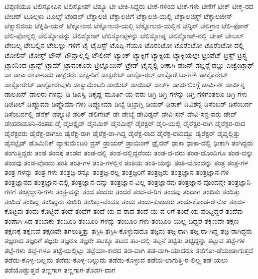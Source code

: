 {ಟಿಪ್ಪಣಿಯೂ
ಟಿಲಿಸ್ಕೋಪಿನ
ಟಿಲಿಸ್ಕೋಪ್
ಟಿಶ್ಯೂ
ಟೀ
ಟೀಕಿ-ಸಿದ್ದರು
ಟೀಕೆ-ಗಳಿಂದ
ಟೀಕೆ-ಗಳು
ಟೀಕೆಗೆ
ಟೀಕ್
ಟೀಕ್ಮ-ರದ
ಟೀಚರ್
ಟೂಲ್ಗಳು
ಟೂಲ್ಸ್
ಟೆಂಡಲ್
ಟೆಕ್ನಾಲಜಿ
ಟೆಕ್ನಾಲಜಿಗೆ
ಟೆಕ್ನಾಲಜಿ-ಯಲ್ಲಿ
ಟೆಕ್ನಾಲಜಿಸ್ಟ್
ಟೆಕ್ನಾಲಜೀಸ್
ಟೆಕ್ನಾಲಿಜಿಯ
ಟೆಕ್ನಿಷಿ-ಯನ್
ಟೆಕ್ನೋಲಜಿ
ಟೆಕ್ನೋಲಜಿ-ಯಲ್ಲಿ
ಟೆಕ್ನೋಲಜಿ-ಯಲ್ಲಿನ
ಟೆನ್ನಿಸ್
ಟೆಲಿಗ್ರಾಂ
ಟೆಲಿ-ಫೋನ್
ಟೆಲಿ-ಫೋನ್ನಲ್ಲಿ
ಟೆಲಿಸ್ಕೋಪನ್ನು
ಟೆಲಿಸ್ಕೋಪ್
ಟೆಲಿಸ್ಕೋಪ್ಗಳನ್ನು
ಟೆಲಿಸ್ಕೋಪ್ನ
ಟೆಲಿಸ್ಕೋಪ್-ನಲ್ಲಿ
ಟೇಪ್
ಟೇಬಲ್
ಟೇಬಲ್ನ
ಟೇಬಲ್ಲಿನ
ಟೇಬಲ್ಲು-ಗಳಿಗೆ
ಟೈ
ಟೈಪಿಸ್ಟ್
ಟೊಪ್ಪಿ-ಗೆಯೂ
ಟೊರಂಟೋ
ಟೊರೆಂಟೋ
ಟೊರೆಂಟೋ-ದಲ್ಲಿ
ಟೋಲಿನ್
ಟೋಸ್ಟ್
ಟೌನ್
ಟೌನ್ಹಾಲ್ನಲ್ಲಿ
ಟೌಲೀನ್
ಟ್ಯಾಂಕ್
ಟ್ಯಾಕ್ಸಿಗೆ
ಟ್ಯಾಕ್ಸಿಯ
ಟ್ಯಾಕ್ಸಿಯಲ್ಲೇ
ಟ್ರಂಪೆಟ್
ಟ್ರಸ್ಟ್
ಟ್ರಸ್ಟ್ನ
ಟ್ರಾಂನಿಂದ
ಟ್ರಾನ್ಸ್
ಟ್ರಾಮ್
ಟ್ರಾವಂಕೂರು
ಟ್ರಿಲ್ಲೊಯಿನ್
ಟ್ರೇಡ್
ಟ್ರೈನ್ನಲ್ಲಿ
ಠೀಕಾಗಿ
ಡಜನ್
ಡಬ್ಲಿನ್ಗೆ
ಡಬ್ಲು-ಎಚ್ವೆಂಟ್ರಾಫ್
ಡಾ
ಡಾಎ
ಡಾಕಾ-ಅದು
ಡಾಕ್ಟರರು
ಡಾಕ್ಟ-ರಿಗೆ
ಡಾಕ್ಟರೇಟ್
ಡಾಕ್ಟೊ-ರಲ್
ಡಾಕ್ಟೊರೇಟು-ಗಳೇ
ಡಾಕ್ಟೊರೇಟ್
ಡಾಕ್ಟೋರೇಟ್
ಡಾಕ್ಟೋರೇಟ್ಗಳು
ಡಾಕ್ಯುಮೆಂಟರಿ
ಡಾಯಿಟ್
ಡಾಯಿಷ್
ಡಾರ್ಕ್
ಡಾರ್ಜಿಲಿಂಗ್ಗೆ
ಡಾರ್ವಿನ್
ಡಾರ್ವಿನ್ನ
ಡಾಲಖನ್
ಡಾಲರು-ಗಳನ್ನು
ಡಿ
ಡಿಎಸ್ಸಿ
ಡಿಕೃಷ್ಣ-ಮೂರ್ತಿ-ಯ-ವರು
ಡಿಗ್ರಿ
ಡಿಗ್ರಿ-ಗಳನ್ನು
ಡಿಗ್ರಿ-ಗಳಿಗಂತಲೂ
ಡಿಗ್ರಿ-ಗಳು
ಡಿಜಿಟಲ್
ಡಿಪ್ಲೊಮಾ
ಡಿಪ್ಲೊಮಾ-ಗಳು
ಡಿಪ್ಲೋಮಾ
ಡಿಬ್ಯೆ
ಡಿಬ್ರಾಗ್ಲಿ
ಡಿಯರ್
ಡಿರಾಕ್
ಡಿವಿಶನ್ನ
ಡಿಸೆಂಬರ್
ಡಿಸೆಂಬರ್ನ
ಡಿಸೆಂಬರ್ನಲ್ಲಿ
ಡೆನೆಕ್
ಡೆಪ್ಯೂಟಿ
ಡೆರಿಕ್
ಡೆಲಿಗೇಟ್
ಡೇ
ಡೇಬ್ಯೆ
ಡೇವಿಡ್ಸನ್
ಡೇವಿ-ಸನ್
ಡೇವಿ-ಸನ್ರ-ವರು
ಡೇವ್
ಡೇಹರಾಡೂನಿ-ನಂತಹ
ಡೈ
ಡೈಆಕ್ಸೈಡ್
ಡೈನಮಿಕ್
ಡೈನಮಿಕ್ಸ್
ಡೈರಕ್ಟರ್
ಡೈರಿ-ಯಲ್ಲಿ
ಡೈರೆಕ್ಟರ-ರಾಗಿ
ಡೈರೆಕ್ಟರ-ರಾದ
ಡೈರೆಕ್ಟರರು
ಡೈರೆಕ್ಟ-ರಾಗಲು
ಡೈರೆಕ್ಟ-ರಾಗಿ
ಡೈರೆಕ್ಟ-ರಾ-ಗಿದ್ದ
ಡೈರೆಕ್ಟ-ರಾದ
ಡೈರೆಕ್ಟ-ರಾದದ್ದೂ
ಡೈರೆಕ್ಟರ್
ಡೈವ್ನಲ್ಲಿತ್ತು
ಡೈಸಲ್ಫೈಡ್
ಡೊಮಿನಿಕ್
ಡ್ಯಾಕುಮೆಂಟರಿ
ಡ್ರಸ್
ಡ್ರಾಯರ್
ಡ್ರಾಯಿಂಗ್
ಡ್ರೈವರ್
ಢಾಕಾ
ಢಾಕಾ-ದಲ್ಲಿ
ಢೀಕಾಗಿ
ತಂಗಿದ್ದರು
ತಂಗುತ್ತಿದ್ದರು
ತಂಡ
ತಂಡಕ್ಕೆ
ತಂಡದ
ತಂಡ-ದಲ್ಲಿ
ತಂಡ-ದಲ್ಲಿದ್ದರೆಂದು
ತಂಡ-ದ-ವರು
ತಂಡ-ದೊಂದಿಗೂ
ತಂಡ-ವನ್ನು
ತಂಡವು
ತಂಡ-ವೊಂದು
ತಂತಿ
ತಂತಿ-ಗಳ
ತಂತಿ-ಗಳಲ್ಲಿನ
ತಂತಿಯ
ತಂತಿ-ಯನ್ನು
ತಂತಿ-ಯೊಂದನ್ನು
ತಂತ್ರ
ತಂತ್ರ-ಗಳ
ತಂತ್ರ-ಗಳನ್ನು
ತಂತ್ರ-ಗಳು
ತಂತ್ರಜ್ಞ-ರನ್ನೂ
ತಂತ್ರಜ್ಞ-ರಲ್ಲ
ತಂತ್ರಜ್ಞರಿಗೆ
ತಂತ್ರಜ್ಞರು
ತಂತ್ರಜ್ಞಾನ
ತಂತ್ರಜ್ಞಾನ-ಗಳ
ತಂತ್ರಜ್ಞಾನದ
ತಂತ್ರಜ್ಞಾನ-ದಲ್ಲಿ
ತಂತ್ರಜ್ಞಾನ-ವನ್ನು
ತಂತ್ರಜ್ಞಾನ-ವಿಲ್ಲ
ತಂತ್ರಜ್ಞಾನವು
ತಂತ್ರಜ್ಞಾನ-ವೊಂದನ್ನೇ
ತಂತ್ರಜ್ಞಾನಿ-ಗಳಿಗೆ
ತಂತ್ರಜ್ಞಾನಿ-ಗಳು
ತಂತ್ರ-ವನ್ನು
ತಂದ
ತಂದರು
ತಂದರೆ
ತಂದ-ವ-ರಿಗೆ
ತಂದವು
ತಂದಾಗ
ತಂದಿತು
ತಂದಿತ್ತು
ತಂದಿದೆ
ತಂದಿದ್ದ
ತಂದಿದ್ದರು
ತಂದಿರಿ
ತಂದಿಲ್ಲ-ವೆಂದೂ
ತಂದು
ತಂದು-ಕೊಂಡರು
ತಂದು-ಕೊಂಡ-ರೇನೋ
ತಂದು-ಕೊಟ್ಟವು
ತಂದು-ಕೊಟ್ಟಿದೆ
ತಂದೆ
ತಂದೆಗೆ
ತಂದೆ-ಯ-ವ-ರಾದ
ತಂದೆ-ಯ-ವ-ರಿಗೆ
ತಂದೆ-ಯ-ವರಿದ್ದಿದ್ದರೆ
ತಂದೆವು
ತಂಪಾಗಿ-ಸಿದ
ತಂಬಾಕು
ತಂಬೂರಿ
ತಂಬೂರಿ-ಗಳನ್ನು
ತಂಬೂರಿ-ಗಳು
ತಂಬೂರಿ-ಯಿಲ್ಲ-ದಿದ್ದರೆ
ತಕ್ಞಣವೇ
ತಕ್ಷಣ
ತಕ್ಷಣಕ್ಕೆ
ತಕ್ಷಣವೆ
ತಕ್ಷಣವೇ
ತಗಲುತ್ತಿತ್ತು
ತಗ್ಗಿಸಿ
ತಗ್ಗಿಸಿ-ಕೊಳ್ಳುವುದೂ
ತಜ್ಞನು
ತಜ್ಞ-ರಾಗಿ
ತಜ್ಞ-ರಾ-ಗಿದ್ದ
ತಜ್ಞ-ರಾಗಿದ್ದರು
ತಜ್ಞರಾದ
ತಜ್ಞರಿಗೆ
ತಜ್ಞರು
ತಜ್ಞರೂ
ತಜ್ಞರೇ
ತಟಕ್ಕೂ
ತಟದ
ತಟ-ದಲ್ಲಿ
ತಟ್ಟನೆ
ತಟ್ಟಿತು
ತಟ್ಟಿದ್ದನ್ನು
ತಟ್ಟುವ
ತಟ್ಟೆ-ಗಳ
ತಟ್ಟೆ-ಗಳು
ತಟ್ಟೆ-ಗಳೂ
ತಟ್ಟೆ-ಯಲ್ಲಿಟ್ಟು
ತಟ್ಟೆಯಾ-ಕಾರದ
ತಡ-ವಾಗಿ
ತಡ-ವಾಗಿ-ಯಾದರೂ
ತಡೆಗೋ-ಡೆಯಂತಾಗುತ್ತದೆ
ತಡೆದು-ಕೊಳ್ಳ-ಬಲ್ಲದು
ತಡೆದು-ಕೊಳ್ಳ-ಬಲ್ಲುದು
ತಡೆದು-ಕೊಳ್ಳುವ
ತಡೆಯ-ಲಾಗುತ್ತಿ-ರ-ಲಿಲ್ಲ
ತಡೆ-ಯಲು
ತಡೆಯೊಡ್ಡುತ್ತವೆ
ತಣ್ಣಗಾಗ
ತಣ್ಣಗಾಗ-ತೊಡಗಿ-ದಾಗ
}
